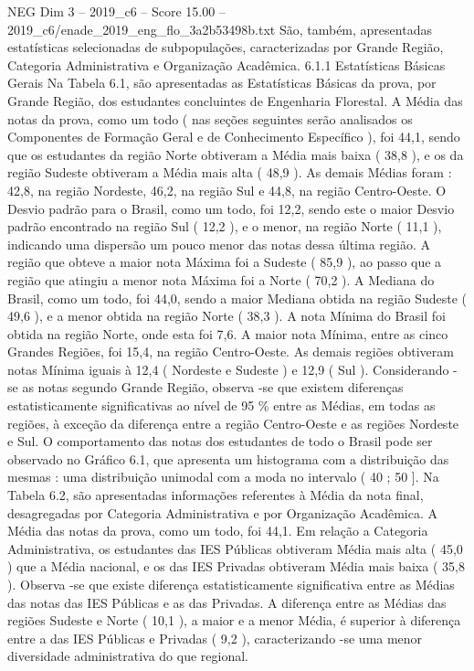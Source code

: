\begin{textsample}{NEG Dim 3 – 2019\_c6 – Score 15.00 – 2019\_c6/enade\_2019\_eng\_flo\_3a2b53498b.txt}
São, também, apresentadas estatísticas selecionadas de subpopulações, caracterizadas por Grande Região, Categoria Administrativa e Organização Acadêmica. 6.1.1 Estatísticas Básicas Gerais Na Tabela 6.1, são apresentadas as Estatísticas Básicas da prova, por Grande Região, dos estudantes concluintes de Engenharia Florestal.
A Média das notas da prova, como um todo ( nas seções seguintes serão analisados os Componentes de Formação Geral e de Conhecimento Específico ), foi 44,1, sendo que os estudantes da região Norte obtiveram a Média mais baixa ( 38,8 ), e os da região Sudeste obtiveram a Média mais alta ( 48,9 ).
As demais Médias foram : 42,8, na região Nordeste, 46,2, na região Sul e 44,8, na região Centro-Oeste.
O Desvio padrão para o Brasil, como um todo, foi 12,2, sendo este o maior Desvio padrão encontrado na região Sul ( 12,2 ), e o menor, na região Norte ( 11,1 ), indicando uma dispersão um pouco menor das notas dessa última região.
A região que obteve a maior nota Máxima foi a Sudeste ( 85,9 ), ao passo que a região que atingiu a menor nota Máxima foi a Norte ( 70,2 ).
A Mediana do Brasil, como um todo, foi 44,0, sendo a maior Mediana obtida na região Sudeste ( 49,6 ), e a menor obtida na região Norte ( 38,3 ).
A nota Mínima do Brasil foi obtida na região Norte, onde esta foi 7,6.
A maior nota Mínima, entre as cinco Grandes Regiões, foi 15,4, na região Centro-Oeste.
As demais regiões obtiveram notas Mínima iguais à 12,4 ( Nordeste e Sudeste ) e 12,9 ( Sul ).
Considerando -se as notas segundo Grande Região, observa -se que existem diferenças estatisticamente significativas ao nível de 95 \% entre as Médias, em todas as regiões, à exceção da diferença entre a região Centro-Oeste e as regiões Nordeste e Sul.
O comportamento das notas dos estudantes de todo o Brasil pode ser observado no Gráfico 6.1, que apresenta um histograma com a distribuição das mesmas : uma distribuição unimodal com a moda no intervalo ( 40 ; 50 ].
Na Tabela 6.2, são apresentadas informações referentes à Média da nota final, desagregadas por Categoria Administrativa e por Organização Acadêmica.
A Média das notas da prova, como um todo, foi 44,1.
Em relação a Categoria Administrativa, os estudantes das IES Públicas obtiveram Média mais alta ( 45,0 ) que a Média nacional, e os das IES Privadas obtiveram Média mais baixa ( 35,8 ).
Observa -se que existe diferença estatisticamente significativa entre as Médias das notas das IES Públicas e as das Privadas.
A diferença entre as Médias das regiões Sudeste e Norte ( 10,1 ), a maior e a menor Média, é superior à diferença entre a das IES Públicas e Privadas ( 9,2 ), caracterizando -se uma menor diversidade administrativa do que regional.

\end{textsample}

